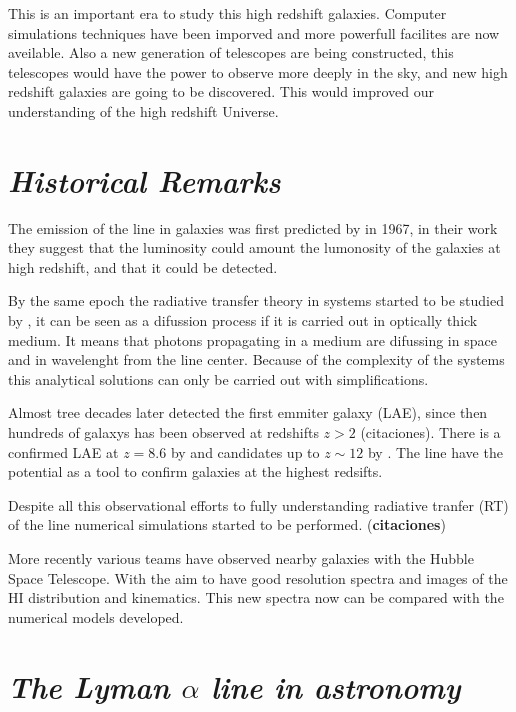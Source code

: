 This is an important era to study this high redshift galaxies. Computer 
simulations techniques have been imporved and more powerfull facilites are
now aveilable. Also a new generation of telescopes are being constructed,
this telescopes would have the power to observe more deeply in the sky, 
and new high redshift galaxies are going to be discovered. This would 
improved our understanding of the high redshift Universe. 

\section{\emph{Historical Remarks}}

The emission of the \ly line in galaxies was first predicted by 
\citep{PartridgePeebles} in 1967, in their work they suggest that the \ly luminosity
could amount the lumonosity of the galaxies at high redshift, and that 
it could be detected. 

By the same epoch the radiative transfer theory in \ly systems started to be
 studied by \citep{Osterbrock62, Adams72,Harrington73, Neufeld90},
 it can be seen as a difussion process if it is carried out in 
 optically thick medium. It means that \ly photons propagating 
in a medium are difussing in space and in wavelenght from the line center.   
Because of the complexity of the systems this analytical solutions 
can only be carried out with simplifications. 


Almost tree decades later \citep{DjorgovskiThomson92} detected the first \ly emmiter galaxy (LAE), since then hundreds of galaxys has been  
observed at redshifts $z>2$ (citaciones). There is a confirmed LAE at $z=8.6$ by \citep{Lenhert2010} and candidates up to $z\sim12$ by \citep{Brammer12}. 
The \ly line have the potential as a tool to confirm galaxies at the highest 
redsifts. 

Despite all this observational efforts to fully understanding radiative
tranfer (RT) of the \ly line numerical simulations started to be performed.
({\bf{citaciones}})

More recently various teams \citep{Mas-Hesse09,LARS} have
observed nearby galaxies with the Hubble Space Telescope. With the
aim to have good resolution spectra and images of the HI distribution 
and kinematics. This new spectra now can be compared with the numerical 
models developed.

 

\section{\emph{The Lyman $\alpha$ line in astronomy}}\label{sec:lyuses}

